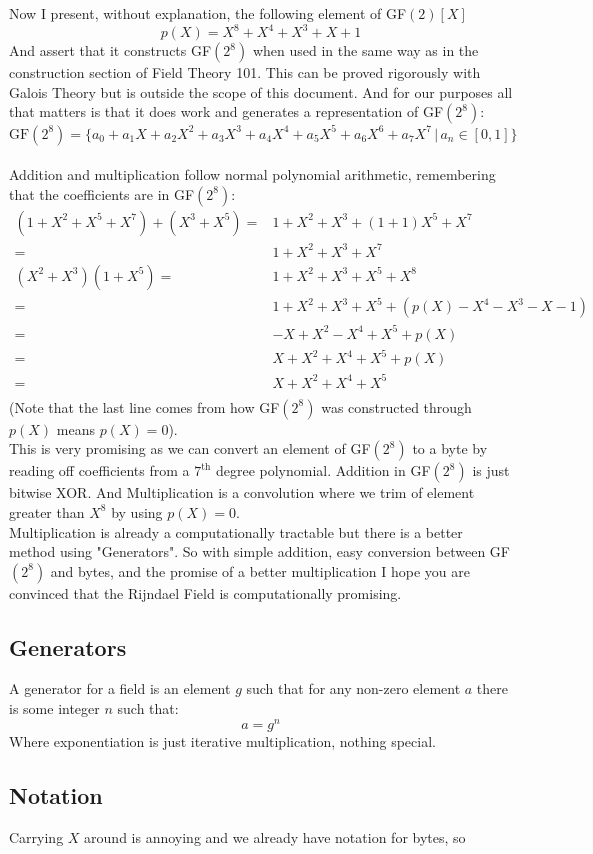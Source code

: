 Now I present, without explanation, the following element of GF$(2)[X]$
\[p(X) = X^8+X^4+X^3+X+1\]
And assert that it constructs GF$(2^8)$ when used in the same way as in the construction section of Field Theory 101.
This can be proved rigorously with Galois Theory but is outside the scope of this document.
And for our purposes all that matters is that it does work and generates a representation of GF$(2^8)$:
\[\text{GF}(2^8) = \{a_0 + a_1X+a_2X^2+a_3X^3+a_4X^4+a_5X^5+a_6X^6+a_7X^7\,|\,a_n\in[0,1]\}\]
\\

Addition and multiplication follow normal polynomial arithmetic,
remembering that the coefficients are in GF$(2^8)$:
\begin{equation*}
\begin{aligned}
	(1+X^2+X^5+X^7) + (X^3+X^5) =& 1+X^2 +X^3+(1+1)X^5+X^7\\
	=& 1+X^2 +X^3 +X^7\\
	(X^2+X^3) (1+X^5) =& 1+X^2+X^3+X^5+X^8 \\
	=& 1+X^2+X^3+X^5+(p(X)-X^4-X^3-X-1) \\
	=& -X+X^2-X^4+X^5+p(X) \\
	=& X+X^2+X^4+X^5+p(X) \\
	=& X+X^2+X^4+X^5 \\
\end{aligned}
\end{equation*}
(Note that the last line comes from how GF$(2^8)$ was constructed through $p(X)$ means $p(X) = 0$).
\\

This is very promising as we can convert an element of GF$(2^8)$ to a byte by reading off coefficients from a $7^\text{th}$ degree polynomial.
Addition in GF$(2^8)$ is just bitwise XOR.
And Multiplication is a convolution where we trim of element greater than $X^8$ by using $p(X)=0$. 
\\

Multiplication is already a computationally tractable but there is a better method using "Generators".
So with simple addition, easy conversion between GF$(2^8)$ and bytes, and the promise of a better multiplication I hope you are convinced that the Rijndael Field is computationally promising.

\subsection{Generators}
A generator for a field is an element $g$ such that for any non-zero element $a$ there is some integer $n$ such that:
\[ a = g^n\]
Where exponentiation is just iterative multiplication, nothing special.
\\

\subsection{Notation}
Carrying $X$ around is annoying and we already have notation for bytes, so 
